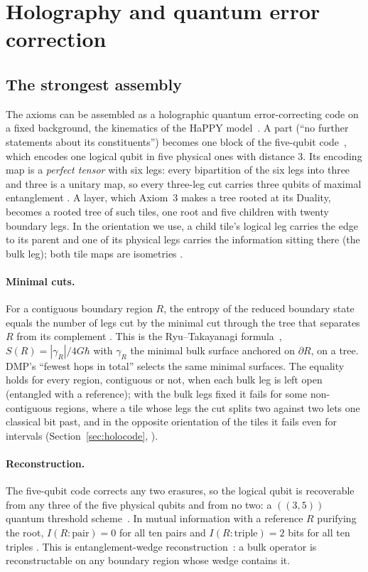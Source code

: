 \section{Holography and quantum error correction}\label{sec:holo}


\subsection{The strongest assembly}

The axioms can be assembled as a holographic quantum error-correcting code on a fixed background, the kinematics of the HaPPY
model~\cite{happy}. A part (``no further statements about its constituents'') becomes one block of the five-qubit code~\cite{laflamme},
which encodes one logical qubit in five physical ones with distance 3. Its encoding map is a \emph{perfect tensor} with six legs: every
bipartition of the six legs into three and three is a unitary map, so every three-leg cut carries three qubits of maximal entanglement
. A layer, which Axiom~3 makes a tree rooted at its Duality, becomes a rooted tree of such tiles, one root and five children with
twenty boundary legs. In the orientation we use, a child tile's logical leg carries the edge to its parent and one of its physical legs
carries the information sitting there (the bulk leg); both tile maps are isometries .

\paragraph{Minimal cuts.} For a contiguous boundary region $R$, the entropy of the reduced boundary state equals the number of legs cut
by the minimal cut through the tree that separates $R$ from its complement . This is the Ryu--Takayanagi formula~\cite{rt},
$S(R)=|\gamma_R|/4G\hbar$ with $\gamma_R$ the minimal bulk surface anchored on $\partial R$, on a tree. DMP's ``fewest hops in total''
selects the same minimal surfaces. The equality holds for every region, contiguous or not, when each bulk leg is left open (entangled with
a reference); with the bulk legs fixed it fails for some non-contiguous regions, where a tile whose legs the cut splits two against two
lets one classical bit past, and in the opposite orientation of the tiles it fails even for intervals (Section~\ref{sec:holocode},
).

\paragraph{Reconstruction.} The five-qubit code corrects any two erasures, so the logical qubit is recoverable from any three of the five
physical qubits and from no two: a $((3,5))$ quantum threshold scheme~\cite{cgl}. In mutual information with a reference $R$ purifying the
root, $I(R:\text{pair})=0$ for all ten pairs and $I(R:\text{triple})=2$ bits for all ten triples . This is entanglement-wedge
reconstruction~\cite{adh}: a bulk operator is reconstructable on any boundary region whose wedge contains it.

